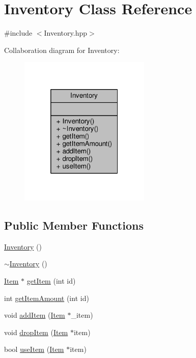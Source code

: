 \hypertarget{class_inventory}{\section{Inventory Class Reference}
\label{class_inventory}
}


{\ttfamily \#include $<$Inventory.\-hpp$>$}



Collaboration diagram for Inventory\-:\nopagebreak
\begin{figure}[H]
\begin{center}
\leavevmode
\includegraphics[width=176pt]{class_inventory__coll__graph}
\end{center}
\end{figure}
\subsection*{Public Member Functions}
\begin{DoxyCompactItemize}
\item 
\hyperlink{class_inventory_a10485613fc8bfb32ee564d9b5110f8fb}{Inventory} ()
\item 
\hyperlink{class_inventory_a6c6dfcb6d977c74a7abf46809e892e3d}{$\sim$\-Inventory} ()
\item 
\hyperlink{class_item}{Item} $\ast$ \hyperlink{class_inventory_ac2f2ac468bc71956df929d50c225061b}{get\-Item} (int id)
\item 
int \hyperlink{class_inventory_a038a62eaa160afe9887d0996e2304286}{get\-Item\-Amount} (int id)
\item 
void \hyperlink{class_inventory_aa0b4bf4cff9a961fbcb2df1715bf7f30}{add\-Item} (\hyperlink{class_item}{Item} $\ast$\-\_\-item)
\item 
void \hyperlink{class_inventory_a403825da8a0bf8d43dabaf4673e9d0f2}{drop\-Item} (\hyperlink{class_item}{Item} $\ast$item)
\item 
bool \hyperlink{class_inventory_a9adc2961b1aea3a9cf86903646d11e65}{use\-Item} (\hyperlink{class_item}{Item} $\ast$item)
\end{DoxyCompactItemize}


